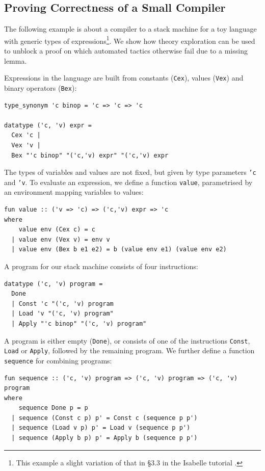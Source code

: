 \subsection{Proving Correctness of a Small Compiler}
\label{sec:comp-ex}
The following example is about a compiler to a stack machine for a toy language with generic types of expressions\footnote{This example a slight variation of that in \S3.3 in the Isabelle tutorial \cite{isabelle}. }. We show how theory exploration can be used to unblock a proof on which automated tactics otherwise fail due to a missing lemma.

Expressions in the language are built from constants (\texttt{Cex}), values (\texttt{Vex}) and binary operators (\texttt{Bex}): 
\begin{small}
\begin{verbatim}
type_synonym 'c binop = 'c => 'c => 'c

datatype ('c, 'v) expr =
  Cex 'c |
  Vex 'v |
  Bex "'c binop" "('c,'v) expr" "('c,'v) expr
\end{verbatim}
\end{small}
The types of variables and values are not fixed, but given by type parameters \texttt{'c} and \texttt{'v}.
To evaluate an expression, we define a function \texttt{value}, parametrised by an environment mapping variables to values:
\begin{small}
\begin{verbatim}
fun value :: ('v => 'c) => ('c,'v) expr => 'c
where
    value env (Cex c) = c 
  | value env (Vex v) = env v
  | value env (Bex b e1 e2) = b (value env e1) (value env e2)
\end{verbatim}
\end{small}
A program for our stack machine consists of four instructions:
\begin{small}
\begin{verbatim}
datatype ('c, 'v) program =
  Done
  | Const 'c "('c, 'v) program
  | Load 'v "('c, 'v) program"
  | Apply "'c binop" "('c, 'v) program"
\end{verbatim}
\end{small}
A program is either empty (\texttt{Done}), or consists of one of the instructions \texttt{Const}, \texttt{Load} or \texttt{Apply}, followed by the remaining program. We further define a function \texttt{sequence} for combining programs:
\begin{small}
\begin{verbatim}
fun sequence :: ('c, 'v) program => ('c, 'v) program => ('c, 'v) program
where
    sequence Done p = p
  | sequence (Const c p) p' = Const c (sequence p p')
  | sequence (Load v p) p' = Load v (sequence p p')
  | sequence (Apply b p) p' = Apply b (sequence p p') 
\end{verbatim}
\end{small}
